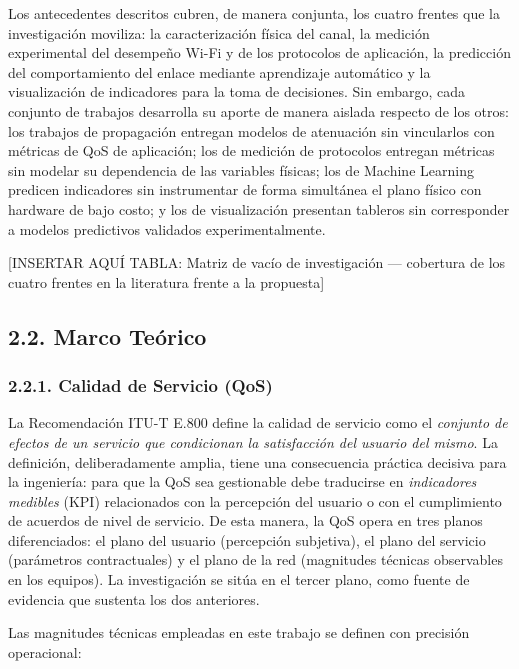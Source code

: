 \documentclass[
  12pt,
]{article}
\begin{document}
Los antecedentes descritos cubren, de manera conjunta, los cuatro
frentes que la investigación moviliza: la caracterización física del
canal, la medición experimental del desempeño Wi-Fi y de los protocolos
de aplicación, la predicción del comportamiento del enlace mediante
aprendizaje automático y la visualización de indicadores para la toma de
decisiones. Sin embargo, cada conjunto de trabajos desarrolla su aporte
de manera aislada respecto de los otros: los trabajos de propagación
entregan modelos de atenuación sin vincularlos con métricas de QoS de
aplicación; los de medición de protocolos entregan métricas sin modelar
su dependencia de las variables físicas; los de Machine Learning
predicen indicadores sin instrumentar de forma simultánea el plano
físico con hardware de bajo costo; y los de visualización presentan
tableros sin corresponder a modelos predictivos validados
experimentalmente.

{[}INSERTAR AQUÍ TABLA: Matriz de vacío de investigación — cobertura de
los cuatro frentes en la literatura frente a la propuesta{]}

\subsection{2.2. Marco Teórico}\label{marco-teuxf3rico}

\subsubsection{2.2.1. Calidad de Servicio
(QoS)}\label{calidad-de-servicio-qos}

La Recomendación ITU-T E.800 define la calidad de servicio como el
\emph{conjunto de efectos de un servicio que condicionan la satisfacción
del usuario del mismo}. La definición, deliberadamente amplia, tiene una
consecuencia práctica decisiva para la ingeniería: para que la QoS sea
gestionable debe traducirse en \emph{indicadores medibles} (KPI)
relacionados con la percepción del usuario o con el cumplimiento de
acuerdos de nivel de servicio. De esta manera, la QoS opera en tres
planos diferenciados: el plano del usuario (percepción subjetiva), el
plano del servicio (parámetros contractuales) y el plano de la red
(magnitudes técnicas observables en los equipos). La investigación se
sitúa en el tercer plano, como fuente de evidencia que sustenta los dos
anteriores.

Las magnitudes técnicas empleadas en este trabajo se definen con
precisión operacional:
\end{document}
